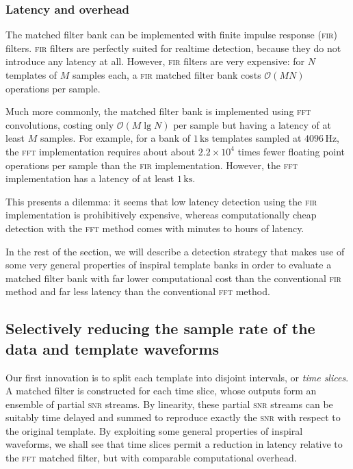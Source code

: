 \subsubsection{Latency and overhead}

The matched filter bank can be implemented with finite impulse response
(\textsc{fir}) filters.  \textsc{fir} filters are perfectly suited for realtime
detection, because they do not introduce any latency at all.  However,
\textsc{fir} filters are very expensive: for $N$ templates of $M$ samples each,
a \textsc{fir} matched filter bank costs $\mathcal O(M N)$ operations per
sample.

Much more commonly, the matched filter bank is implemented using \textsc{fft}
convolutions, costing only $\mathcal O(M \lg N)$  per sample but having a latency of
at least $M$ samples.  For example, for a bank of $1\,\mathrm{ks}$ templates
sampled at $4096\,\mathrm{Hz}$, the \textsc{fft} implementation requires about
about $2.2 \times 10^4$ times fewer floating point operations per sample than
the \textsc{fir} implementation.  However, the \textsc{fft} implementation has
a latency of at least $1\,\mathrm{ks}$.

This presents a dilemma: it seems that low latency detection using the
\textsc{fir} implementation is prohibitively expensive, whereas computationally
cheap detection with the \textsc{fft} method comes with minutes to hours of
latency.

In the rest of the section, we will describe a detection strategy that makes
use of some very general properties of inspiral template banks in order to
evaluate a matched filter bank with far lower computational cost than the
conventional \textsc{fir} method and far less latency than the conventional
\textsc{fft} method.

\subsection{Selectively reducing the sample rate of the data and template waveforms}

Our first innovation is to split each template into disjoint intervals, or
\emph{time slices}.  A matched filter is constructed for each time slice, whose
outputs form an ensemble of partial \textsc{snr} streams.  By linearity, these
partial \textsc{snr} streams can be suitably time delayed and summed to
reproduce exactly the \textsc{snr} with respect to the original template.  By
exploiting some general properties of inspiral waveforms, we shall see that
time slices permit a reduction in latency relative to the \textsc{fft} matched
filter, but with comparable computational overhead.

